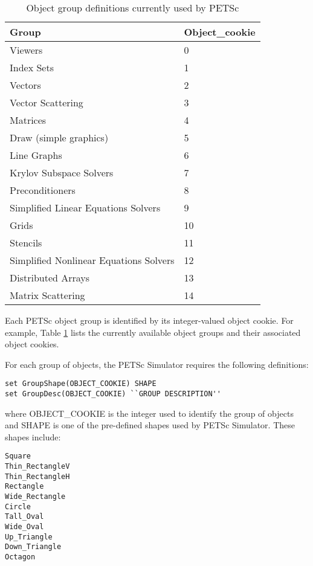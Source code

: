 \begin{table}
\begin{tabular}{||l||l||} \hline
Group                              & Object\_cookie \\ \hline
Viewers                            &  0 \\ \hline
Index Sets                         &  1 \\ \hline
Vectors                            &  2 \\ \hline
Vector Scattering                  &  3 \\ \hline
Matrices                           &  4 \\ \hline
Draw (simple graphics)             &  5 \\ \hline
Line Graphs                        &  6 \\ \hline
Krylov Subspace Solvers            &  7 \\ \hline
Preconditioners                    &  8 \\ \hline
Simplified Linear Equations Solvers     &  9 \\ \hline
Grids                              & 10 \\ \hline
Stencils                           & 11 \\ \hline
Simplified Nonlinear Equations Solvers & 12 \\ \hline
Distributed Arrays                 & 13 \\ \hline
Matrix Scattering                  & 14 \\ \hline
\end{tabular}
\caption{Object group definitions currently used by PETSc}
\label{PETSc object definitions}
\end{table}

Each PETSc object group is identified by its integer-valued object
cookie.  For example, Table \ref{PETSc object definitions} lists the
currently available object groups and their associated object cookies.

For each group of objects, the PETSc Simulator requires the following
definitions:
\begin{verbatim}
set GroupShape(OBJECT_COOKIE) SHAPE 
set GroupDesc(OBJECT_COOKIE) ``GROUP DESCRIPTION''
\end{verbatim}
where OBJECT\_COOKIE is the integer used to identify the group of objects and SHAPE is one of the pre-defined shapes used by PETSc Simulator.  These shapes include:
\begin{verbatim}
Square
Thin_RectangleV
Thin_RectangleH
Rectangle
Wide_Rectangle
Circle
Tall_Oval
Wide_Oval
Up_Triangle
Down_Triangle
Octagon
\end{verbatim}

